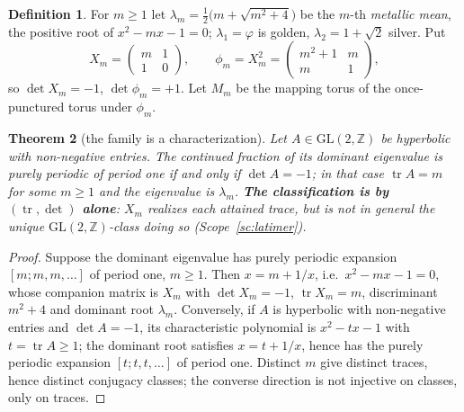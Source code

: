 \documentclass[11pt,reqno]{amsart}
\theoremstyle{plain}
\newtheorem{theorem}{Theorem}[section]
\theoremstyle{definition}
\newtheorem{definition}[theorem]{Definition}
\theoremstyle{remark}
\newcommand{\Z}{\mathbb{Z}}
\newcommand{\GL}{\mathrm{GL}}
\newcommand{\tr}{\operatorname{tr}}
\begin{document}
\begin{definition}
For $m\ge1$ let $\lambda_m=\tfrac12\bigl(m+\sqrt{m^2+4}\bigr)$ be the $m$-th
\emph{metallic mean}, the positive root of $x^2-mx-1=0$; $\lambda_1=\varphi$ is golden,
$\lambda_2=1+\sqrt2$ silver. Put
\[
   X_m=\begin{pmatrix}m&1\\1&0\end{pmatrix},\qquad
   \phi_m=X_m^{2}=\begin{pmatrix}m^2+1&m\\m&1\end{pmatrix},
\]
so $\det X_m=-1$, $\det\phi_m=+1$. Let $M_m$ be the mapping torus of the once-punctured
torus under $\phi_m$.
\end{definition}

\begin{theorem}[the family is a characterization]\label{thm:canonical}
Let $A\in\GL(2,\Z)$ be hyperbolic with non-negative entries. The continued fraction of
its dominant eigenvalue is purely periodic of period one if and only if $\det A=-1$; in
that case $\tr A=m$ for some $m\ge1$ and the eigenvalue is $\lambda_m$. \textbf{The
classification is by $(\tr,\det)$ alone}: $X_m$ realizes each attained trace, but is
\emph{not} in general the unique $\GL(2,\Z)$-class doing so (Scope~\ref{sc:latimer}).
\end{theorem}

\begin{proof}
Suppose the dominant eigenvalue has purely periodic expansion $[m;m,m,\dots]$ of period
one, $m\ge1$. Then $x=m+1/x$, i.e.\ $x^2-mx-1=0$, whose companion matrix is $X_m$ with
$\det X_m=-1$, $\tr X_m=m$, discriminant $m^2+4$ and dominant root $\lambda_m$.
Conversely, if $A$ is hyperbolic with non-negative entries and $\det A=-1$, its
characteristic polynomial is $x^2-tx-1$ with $t=\tr A\ge1$; the dominant root satisfies
$x=t+1/x$, hence has the purely periodic expansion $[t;t,t,\dots]$ of period one.
Distinct $m$ give distinct traces, hence distinct conjugacy classes; the converse
direction is not injective on classes, only on traces.
\end{proof}
\end{document}
